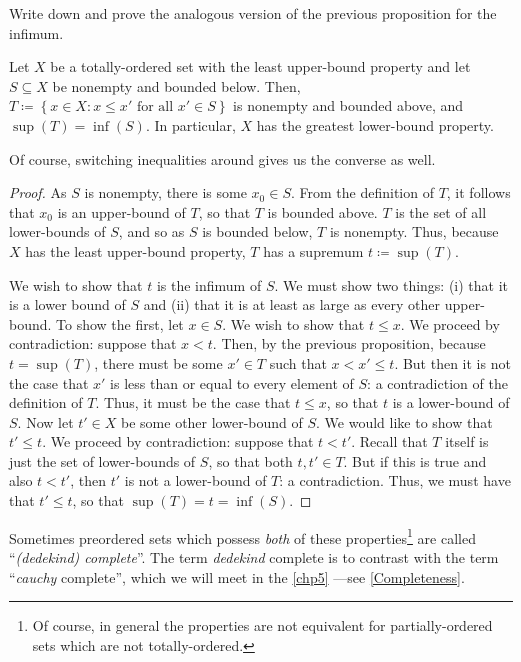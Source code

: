 \begin{exr}
Write down and prove the analogous version of the previous proposition for the infimum.
\end{exr}
\begin{prp}\label{prp1.4.12}
Let $X$ be a totally-ordered set with the least upper-bound property and let $S\subseteq X$ be nonempty and bounded below.  Then, $T\coloneqq \left\{ x\in X:x\leq x'\text{ for all }x'\in S\right\}$ is nonempty and bounded above, and $\sup (T)=\inf (S)$.  In particular, $X$ has the greatest lower-bound property.
\begin{rmk}
Of course, switching inequalities around gives us the converse as well.
\end{rmk}
\begin{proof}
As $S$ is nonempty, there is some $x_0\in S$.  From the definition of $T$, it follows that $x_0$ is an upper-bound of $T$, so that $T$ is bounded above.  $T$ is the set of all lower-bounds of $S$, and so as $S$ is bounded below, $T$ is nonempty.  Thus, because $X$ has the least upper-bound property, $T$ has a supremum $t\coloneqq \sup (T)$.

We wish to show that $t$ is the infimum of $S$.  We must show two things:  (i) that it is a lower bound of $S$ and (ii) that it is at least as large as every other upper-bound.  To show the first, let $x\in S$.  We wish to show that $t\leq x$.  We proceed by contradiction:  suppose that $x<t$.  Then, by the previous proposition, because $t=\sup (T)$, there must be some $x'\in T$ such that $x<x'\leq t$.  But then it is not the case that $x'$ is less than or equal to every element of $S$:  a contradiction of the definition of $T$.  Thus, it must be the case that $t\leq x$, so that $t$ is a lower-bound of $S$.  Now let $t'\in X$ be some other lower-bound of $S$.  We would like to show that $t'\leq t$.  We proceed by contradiction:  suppose that $t<t'$.  Recall that $T$ itself is just the set of lower-bounds of $S$, so that both $t,t'\in T$.  But if this is true and also $t<t'$, then $t'$ is not a lower-bound of $T$:  a contradiction.  Thus, we must have that $t'\leq t$, so that $\sup (T)=t=\inf (S)$.
\end{proof}
\end{prp}
\begin{rmk}
Sometimes preordered sets which possess \emph{both} of these properties\footnote{Of course, in general the properties are not equivalent for partially-ordered sets which are not totally-ordered.} are called ``\emph{(dedekind) complete}''.  The term \emph{dedekind} complete is to contrast with the term ``\emph{cauchy} complete'', which we will meet in the \cref{chp5} ---see \cref{Completeness}.
\end{rmk}

